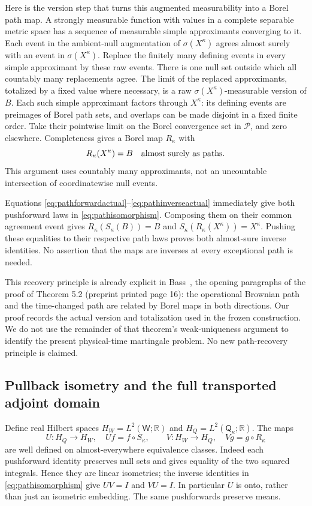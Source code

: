 \documentclass[11pt]{article}
\newcommand{\R}{\mathbb R}
\begin{document}
Here is the version step that turns this augmented measurability
into a Borel path map. A strongly measurable function with values
in a complete separable metric space has a sequence of measurable
simple approximants converging to it. Each event in the ambient-null
augmentation of $\sigma(X^\kappa)$ agrees almost surely with an
event in $\sigma(X^\kappa)$. Replace the finitely many defining
events in every simple approximant by these raw events. There is
one null set outside which all countably many replacements agree.
The limit of the replaced approximants, totalized by a fixed value
where necessary, is a raw $\sigma(X^\kappa)$-measurable version of
$B$. Each such simple approximant factors through $X^\kappa$:
its defining events are preimages of Borel path sets, and overlaps
can be made disjoint in a fixed finite order. Take their pointwise
limit on the Borel convergence set in $\mathcal P$, and zero
elsewhere. Completeness gives a Borel map $R_\kappa$ with
\begin{equation}\label{eq:pathinverseactual}
 R_\kappa(X^\kappa)=B\quad\hbox{almost surely as paths}.
\end{equation}
This argument uses countably many approximants, not an uncountable
intersection of coordinatewise null events.

Equations \eqref{eq:pathforwardactual}--\eqref{eq:pathinverseactual}
immediately give both pushforward laws in \eqref{eq:pathisomorphism}.
Composing them on their common agreement event gives
$R_\kappa(S_\kappa(B))=B$ and
$S_\kappa(R_\kappa(X^\kappa))=X^\kappa$.
Pushing these equalities to their respective path laws proves both
almost-sure inverse identities. No assertion that the maps are
inverses at every exceptional path is needed.

This recovery principle is already explicit in Bass~\cite{Bass},
the opening paragraphs of the proof of Theorem 5.2 (preprint
printed page 16): the operational Brownian path and the time-changed
path are related by Borel maps in both directions. Our proof records
the actual version and totalization used in the frozen construction.
We do not use the remainder of that theorem's weak-uniqueness
argument to identify the present physical-time martingale problem.
No new path-recovery principle is claimed.

\subsection*{Pullback isometry and the full transported adjoint domain}
Define real Hilbert spaces
$H_W=L^2(\mathsf W;\R)$ and $H_Q=L^2(\mathsf Q_\kappa;\R)$.
The maps
\[
 U:H_Q\longrightarrow H_W,\quad Uf=f\circ S_\kappa,
 \qquad V:H_W\longrightarrow H_Q,\quad Vg=g\circ R_\kappa
\]
are well defined on almost-everywhere equivalence classes. Indeed
each pushforward identity preserves null sets and gives equality
of the two squared integrals. Hence they are linear isometries;
the inverse identities in \eqref{eq:pathisomorphism} give
$UV=I$ and $VU=I$. In particular $U$ is onto, rather than just
an isometric embedding. The same pushforwards preserve means.
\end{document}
